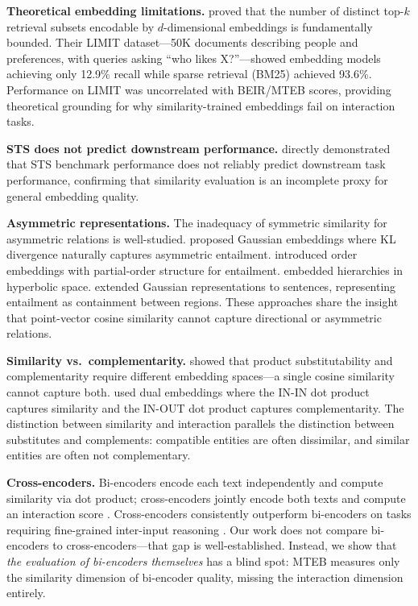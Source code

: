 \documentclass{article}
\begin{document}
\textbf{Theoretical embedding limitations.} \citet{weller2025limit} proved that the number of distinct top-$k$ retrieval subsets encodable by $d$-dimensional embeddings is fundamentally bounded. Their LIMIT dataset---50K documents describing people and preferences, with queries asking ``who likes X?''---showed embedding models achieving only 12.9\% recall while sparse retrieval (BM25) achieved 93.6\%. Performance on LIMIT was uncorrelated with BEIR/MTEB scores, providing theoretical grounding for why similarity-trained embeddings fail on interaction tasks.

\textbf{STS does not predict downstream performance.} \citet{abe2022sts} directly demonstrated that STS benchmark performance does not reliably predict downstream task performance, confirming that similarity evaluation is an incomplete proxy for general embedding quality.

\textbf{Asymmetric representations.} The inadequacy of symmetric similarity for asymmetric relations is well-studied. \citet{vilnis2015word} proposed Gaussian embeddings where KL divergence naturally captures asymmetric entailment. \citet{vendrov2016order} introduced order embeddings with partial-order structure for entailment. \citet{nickel2017poincare} embedded hierarchies in hyperbolic space. \citet{yoda2024gausscse} extended Gaussian representations to sentences, representing entailment as containment between regions. These approaches share the insight that point-vector cosine similarity cannot capture directional or asymmetric relations.

\textbf{Similarity vs.\ complementarity.} \citet{mcauley2015complementary} showed that product substitutability and complementarity require different embedding spaces---a single cosine similarity cannot capture both. \citet{kvernadze2022dual} used dual embeddings where the IN-IN dot product captures similarity and the IN-OUT dot product captures complementarity. The distinction between similarity and interaction parallels the distinction between substitutes and complements: compatible entities are often dissimilar, and similar entities are often not complementary.

\textbf{Cross-encoders.} Bi-encoders encode each text independently and compute similarity via dot product; cross-encoders jointly encode both texts and compute an interaction score \citep{nogueira2019passage, humeau2020polyencoders}. Cross-encoders consistently outperform bi-encoders on tasks requiring fine-grained inter-input reasoning \citep{thakur2021beir}. Our work does not compare bi-encoders to cross-encoders---that gap is well-established. Instead, we show that \emph{the evaluation of bi-encoders themselves} has a blind spot: MTEB measures only the similarity dimension of bi-encoder quality, missing the interaction dimension entirely.
\end{document}
